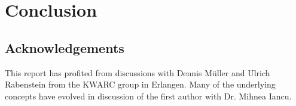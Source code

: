\section{Conclusion}\label{sec:concl}

\subsection*{Acknowledgements}
This report has profited from discussions with Dennis M\"uller and Ulrich Rabenstein from
the KWARC group in Erlangen. Many of the underlying concepts have evolved in discussion of
the first author with Dr. Mihnea Iancu.


